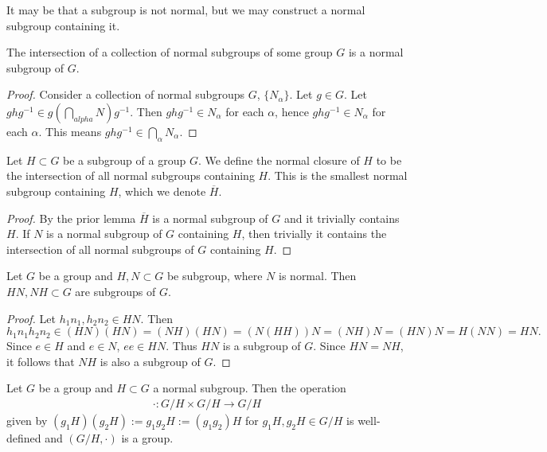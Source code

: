 It may be that a subgroup is not normal, but we may construct a normal subgroup containing it.
\begin{lemma}
    The intersection of a collection of normal subgroups of some group $G$ is a normal subgroup of $G$.
\end{lemma}
\begin{proof}
    Consider a collection of normal subgroups $G$, $\{N_\alpha\}$. Let $g\in G$. Let $ ghg^{-1}\in g\left(\bigcap_{alpha}N\right)g^{-1}$. Then $ghg^{-1} \in N_\alpha$ for each $\alpha$, hence $ghg^{-1}\in N_\alpha$ for each $\alpha$. This means $ghg^{-1}\in \bigcap_\alpha N_\alpha$. 
\end{proof}
\begin{lemma}
    Let $H\subset G$ be a subgroup of a group $G$. We define the normal closure of $H$ to be the intersection of all normal subgroups containing $H$. This is the smallest normal subgroup containing $H$, which we denote $\overline{H}$.
\end{lemma}
\begin{proof}
    By the prior lemma $\overline{H}$ is a normal subgroup of $G$ and it trivially contains $H$. If $N$ is a normal subgroup of $G$ containing $H$, then trivially it contains the intersection of all normal subgroups of $G$ containing $H$. 
\end{proof}
\begin{proposition}
    Let $G$ be a group and $H,N\subset G$ be subgroup, where $N$ is normal. Then $HN,NH\subset G$ are subgroups of $G$. 
\end{proposition}
\begin{proof}
    Let $h_1n_1,h_2n_2\in HN$. Then 
    $$h_1n_1h_2n_2 \in (HN)(HN)=(NH)(HN) = (N(HH))N=(NH)N=(HN)N=H(NN) = HN. $$
    Since $e\in H$ and $e\in N$, $ee\in HN$. Thus $HN$ is a subgroup of $G$. Since $HN=NH$, it follows that $NH$ is also a subgroup of $G$. 
\end{proof}
\begin{proposition}
    Let $G$ be a group and $H\subset G$ a normal subgroup. Then the operation
    \begin{align*}
        \cdot : G/H \times G/H \rightarrow G/H
    \end{align*}
    given by $(g_1H)(g_2H) := g_1g_2H := (g_1g_2)H$ for $g_1H,g_2H\in G/H$ is well-defined and $(G/H,\cdot)$ is a group. 
\end{proposition}

